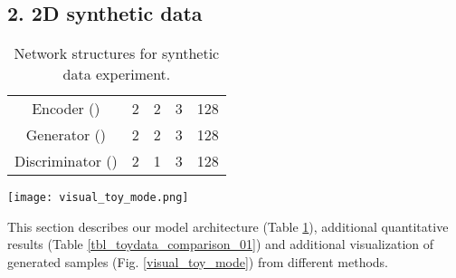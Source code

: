 \documentclass[runningheads]{llncs}
\begin{document}
\subsection*{2. 2D synthetic data}

\begin{table}
\centering
\caption{Network structures for synthetic data experiment.}
\begin{tabular}{c | c c c c}
           &  &  &  &  \\ 
\hline
\hline
Encoder ()            & 2     & 2      & 3        & 128 \\
\hline
Generator ()        & 2     & 2      & 3        & 128 \\
\hline
Discriminator ()  & 2     & 1      & 3        & 128 \\
\end{tabular}
\label{toy_network}
\end{table}

\begin{figure*}
\centering
\texttt{[image: visual\_toy\_mode.png]}
\caption{Visualizing samples generated by different methods on the synthetic dataset.}
\label{visual_toy_mode}
\end{figure*}

This section describes our model architecture (Table \ref{toy_network}), additional quantitative results (Table \ref{tbl_toydata_comparison_01}) and additional visualization of generated samples (Fig. \ref{visual_toy_mode}) from different methods. 
\end{document}
